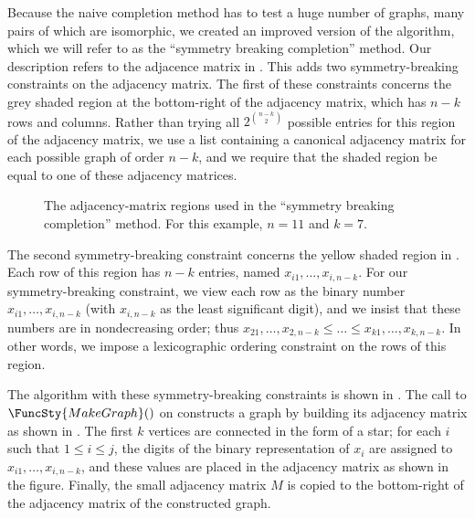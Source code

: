 Because the naive completion method has to test a huge number of graphs,
many pairs of which are isomorphic, we created an improved version of the
algorithm, which we will refer to as the ``symmetry breaking completion''
method.  Our description refers to the adjacence matrix in
.
This adds two symmetry-breaking constraints on the adjacency matrix.
The first of these constraints concerns the grey shaded region at the bottom-right
of the adjacency matrix, which has $n - k$ rows and columns.  Rather than
trying all $2^{n-k \choose 2}$ possible entries for this region of the
adjacency matrix, we use a list containing a canonical adjacency matrix
for each possible graph of order $n-k$, and we require that the shaded
region be equal to one of these adjacency matrices.

\begin{figure}[h!]
    \centering
    \footnotesize
    \caption{The adjacency-matrix regions used in the 
        ``symmetry breaking completion'' method. For this example, $n=11$ and $k=7$.}
\label{fig:regions-for-trees}
\end{figure}

The second symmetry-breaking constraint concerns the yellow shaded region
in . Each row of this region has $n-k$ entries,
named $x_{i1}, \dots, x_{i,n-k}$.  For our symmetry-breaking constraint, we
view each row as the binary number $x_{i1}, \dots, x_{i,n-k}$
(with $x_{i,n-k}$ as the least significant digit), and we insist
that these numbers are in nondecreasing order; thus
$x_{21}, \dots, x_{2,n-k} \leq \dots \leq x_{k1}, \dots, x_{k,n-k}$.
In other words, we impose a lexicographic ordering constraint
on the rows of this region.

The algorithm with these symmetry-breaking constraints is shown
in .  The call to $\FuncSty{MakeGraph}()$ on
 constructs a graph by building its
adjacency matrix as shown in .  The
first $k$ vertices are connected in the form of a star;
for each $i$ such that $1 \leq i \leq j$, the digits of the binary
representation of $x_i$
are assigned to $x_{i1}, \dots, x_{i,n-k}$, and these values
are placed in the adjacency matrix as shown in the figure.  Finally,
the small adjacency matrix $M$ is copied to the bottom-right of
the adjacency matrix of the constructed graph.

